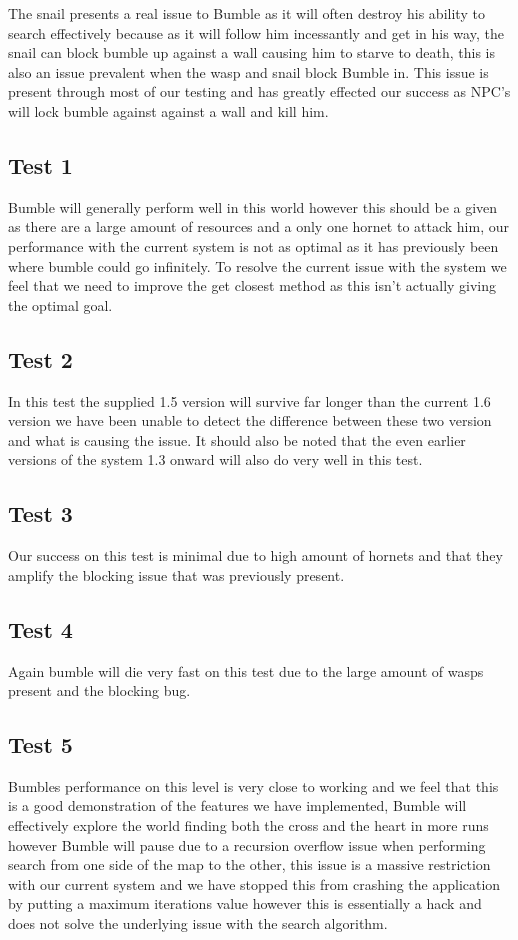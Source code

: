 \documentclass[a4paper,oneside]{report}
\begin{document}
	The snail presents a real issue to Bumble as it will often destroy his ability to search effectively because as it will follow him incessantly and get in his way, the snail can block bumble up against a wall causing him to starve to death, this is also an issue prevalent when the wasp and snail block Bumble in. This issue is present through most of our testing and has greatly effected our success as NPC's will lock bumble against against a wall and kill him.  

	\subsection{Test 1}
		Bumble will generally perform well in this world however this should be a given as there are a large amount of resources and a only one hornet to attack him, our performance with the current system is not as optimal as it has previously been where bumble could go infinitely. To resolve the current issue with the system we feel that we need to improve the get closest method as this isn't actually giving the optimal goal. 
		
	\subsection{Test 2}
		 In this test the supplied 1.5 version will survive far longer than the current 1.6 version we have been unable to detect the difference between these two version and what is causing the issue. It should also be noted that the even earlier versions of the system 1.3 onward will also do very well in this test.
		
		\subsection{Test 3}
		Our success on this test is minimal due to high amount of hornets and that they amplify the blocking issue that was previously present. 
		
		\subsection{Test 4}
		Again bumble will die very fast on this test due to the large amount of wasps present and the blocking bug.
		
	
	\subsection{Test 5}
	Bumbles performance on this level is very close to working and we feel that this is a good demonstration of the features we have implemented, Bumble will effectively explore the world finding both the cross and the heart in more runs however Bumble will pause due to a recursion overflow issue when performing search from one side of the map to the other, this issue is a massive restriction with our current system and we have stopped this from crashing the application by putting a maximum iterations value however this is essentially a hack and does not solve the underlying issue with the search algorithm. 
	
\end{document}
